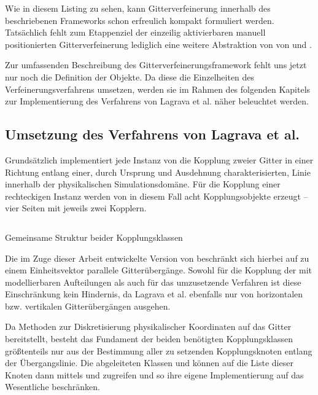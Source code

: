 Wie in diesem Listing zu sehen, kann Gitterverfeinerung innerhalb des beschriebenen Frameworks schon erfreulich kompakt formuliert werden. Tatsächlich fehlt zum Etappenziel der einzeilig aktivierbaren manuell positionierten Gitterverfeinerung lediglich eine weitere Abstraktion von von  und .

\bigskip
Zur umfassenden Beschreibung des Gitterverfeinerungsframework fehlt uns jetzt nur noch die Definition der  Objekte. Da diese die Einzelheiten des Verfeinerungsverfahrens umsetzen, werden sie im Rahmen des folgenden Kapitels zur Implementierung des Verfahrens von Lagrava et al. näher beleuchtet werden.

\newpage
\subsection{Umsetzung des Verfahrens von Lagrava et al.}

Grundsätzlich implementiert jede Instanz von  die Kopplung zweier Gitter in einer Richtung entlang einer, durch Ursprung und Ausdehnung charakterisierten, Linie innerhalb der physikalischen Simulationsdomäne. Für die Kopplung einer rechteckigen  Instanz werden von  in diesem Fall acht Kopplungsobjekte erzeugt -- vier Seiten mit jeweils zwei Kopplern.

\begin{listing}[H]
\inputminted{cpp}{code/coupler2d.cpp}
\caption{Gemeinsame Struktur beider Kopplungsklassen}
\label{lst:Coupler2D}
\end{listing}

Die im Zuge dieser Arbeit entwickelte Version von  beschränkt sich hierbei auf zu einem Einheitsvektor parallele Gitterübergänge. Sowohl für die Kopplung der mit  modellierbaren Aufteilungen als auch für das umzusetzende Verfahren ist diese Einschränkung kein Hindernis, da Lagrava et al. ebenfalls nur von horizontalen bzw. vertikalen Gitterübergängen ausgehen.

Da  Methoden zur Diskretisierung physikalischer Koordinaten auf das Gitter bereitstellt, besteht das Fundament der beiden benötigten Kopplungsklassen größtenteils nur aus der Bestimmung aller zu setzenden Kopplungsknoten entlang der Übergangslinie. Die abgeleiteten Klassen  und  können auf die Liste dieser Knoten dann mittels  und  zugreifen und so ihre eigene Implementierung auf das Wesentliche beschränken.


